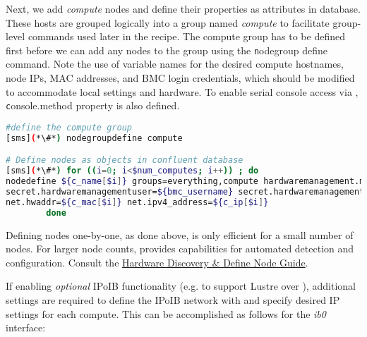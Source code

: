 
\noindent Next, we add {\em compute} nodes and define their properties as
attributes in \Confluent{} database.
These hosts are grouped logically into a group named {\em
compute} to facilitate group-level commands used later in the recipe. The compute
group has to be defined first before we can add any nodes to the group using the 
{\texttt nodegroup define} command. Note the
use of variable names for the desired compute hostnames, node IPs, MAC
addresses, and BMC login credentials, which should be modified to accommodate
local settings and hardware. To enable serial console access via  \Confluent{},
{\texttt console.method}
property is also defined. 

\begin{lstlisting}[language=bash,keywords={},upquote=true,basicstyle=\footnotesize\ttfamily,]
#define the compute group
[sms](*\#*) nodegroupdefine compute

# Define nodes as objects in confluent database
[sms](*\#*) for ((i=0; i<$num_computes; i++)) ; do
nodedefine ${c_name[$i]} groups=everything,compute hardwaremanagement.manager=${c_bmc[$i]} \ 
secret.hardwaremanagementuser=${bmc_username} secret.hardwaremanagementpassword=${bmc_password} \ 
net.hwaddr=${c_mac[$i]} net.ipv4_address=${c_ip[$i]}
        done
\end{lstlisting}

\begin{center}
  \begin{tcolorbox}[]
    \small
Defining nodes one-by-one, as done above, is only efficient
for a small number of nodes. For larger node counts,
\Confluent{} provides capabilities for automated detection and
configuration.
Consult the
\href{https://hpc.lenovo.com/users/documentation/confluentdisco.html}{\color{blue}\Confluent{}
Hardware Discovery \& Define Node Guide}.
\end{tcolorbox}
\end{center}


If enabling {\em optional} IPoIB functionality (e.g. to support Lustre over \InfiniBand{}), additional
settings are required to define the IPoIB network with \Confluent{} and specify
desired IP settings for each compute. This can be accomplished as follows for
the {\em ib0} interface:

